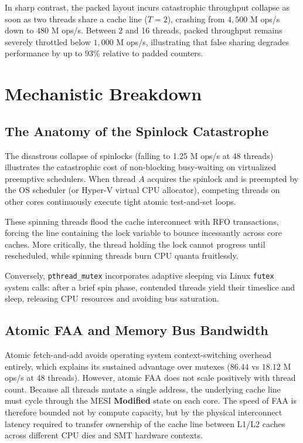 \documentclass[conference]{IEEEtran}
\begin{document}
In sharp contrast, the packed layout incurs catastrophic throughput collapse as soon as two threads share a cache line ($T=2$), crashing from $4,500$ M ops/s down to $480$ M ops/s. Between 2 and 16 threads, packed throughput remains severely throttled below $1,000$ M ops/s, illustrating that false sharing degrades performance by up to $93\%$ relative to padded counters.

\section{Mechanistic Breakdown}

\subsection{The Anatomy of the Spinlock Catastrophe}
The disastrous collapse of spinlocks (falling to 1.25 M ops/s at 48 threads) illustrates the catastrophic cost of non-blocking busy-waiting on virtualized preemptive schedulers. When thread $A$ acquires the spinlock and is preempted by the OS scheduler (or Hyper-V virtual CPU allocator), competing threads on other cores continuously execute tight atomic test-and-set loops. 

These spinning threads flood the cache interconnect with RFO transactions, forcing the line containing the lock variable to bounce incessantly across core caches. More critically, the thread holding the lock cannot progress until rescheduled, while spinning threads burn CPU quanta fruitlessly. 

Conversely, \texttt{pthread\_mutex} incorporates adaptive sleeping via Linux \texttt{futex} system calls: after a brief spin phase, contended threads yield their timeslice and sleep, releasing CPU resources and avoiding bus saturation.

\subsection{Atomic FAA and Memory Bus Bandwidth}
Atomic fetch-and-add avoids operating system context-switching overhead entirely, which explains its sustained advantage over mutexes ($86.44$ vs $18.12$ M ops/s at 48 threads). However, atomic FAA does not scale positively with thread count. Because all threads mutate a single address, the underlying cache line must cycle through the MESI \textbf{Modified} state on each core. The speed of FAA is therefore bounded not by compute capacity, but by the physical interconnect latency required to transfer ownership of the cache line between L1/L2 caches across different CPU dies and SMT hardware contexts.
\end{document}
